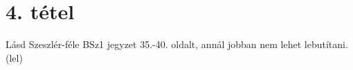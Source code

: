 \section{4. tétel}

Lásd Szeszlér-féle BSz1 jegyzet 35.-40. oldalt, annál jobban nem lehet lebutítani. (lel)

